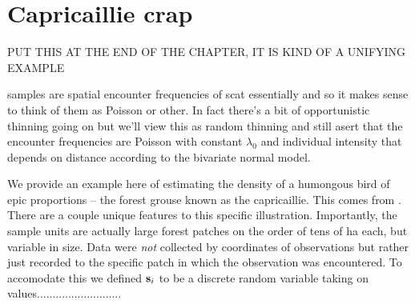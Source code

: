 {



\section{Capricaillie crap}

PUT THIS AT THE END OF THE CHAPTER, IT IS KIND OF A UNIFYING EXAMPLE 

samples are spatial encounter frequencies of scat essentially and so
it makes sense to think of them as Poisson or other.
In fact there's a bit of opportunistic thinning going on but we'll view
this as random thinning and still asert that the encounter frequencies
are Poisson with constant $\lambda_{0}$ and individual intensity that
depends on distance according to the bivariate normal model. 

We provide an example here of estimating the density of a humongous
bird of epic proportions -- the forest grouse known as the
capricaillie. This comes from \citet{mollet_etal:2012}.
There are a couple unique features to this specific
illustration. Importantly, the sample units are actually large forest
patches on the order of tens of ha each, but variable in size. Data
were {\it not} collected by coordinates of observations but rather
just recorded to the specific patch in which the observation was
encountered. To accomodate this we defined ${\bf s}_{i}$ to be a
discrete
random variable taking on values...........................

}
